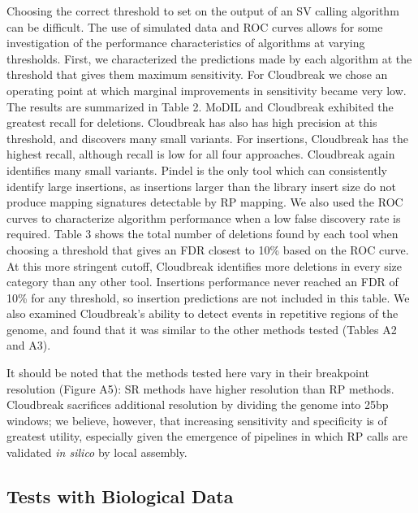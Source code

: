 \documentclass[10pt]{bmc_article}
\newenvironment{bmcformat}{\fussy\setboolean{publ}{true}}{\fussy}
\begin{document}
\begin{bmcformat}
Choosing the correct threshold to set on the output of an SV calling algorithm can be difficult. The use of simulated data and ROC curves allows for some investigation of the performance characteristics of algorithms at varying thresholds. First, we characterized the predictions made by each algorithm at the threshold that gives them maximum sensitivity. For Cloudbreak we chose an operating point at which marginal improvements in sensitivity became very low. The results are summarized in Table 2. MoDIL and Cloudbreak exhibited the greatest recall for deletions. Cloudbreak has also has high precision at this threshold, and discovers many small variants. For insertions, Cloudbreak has the highest recall, although recall is low for all four approaches. Cloudbreak again identifies many small variants. Pindel is the only tool which can consistently identify large insertions, as insertions larger than the library insert size do not produce mapping signatures detectable by RP mapping. We also used the ROC curves to characterize algorithm performance when a low false discovery rate is required. Table 3 shows the total number of deletions found by each tool when choosing a threshold that gives an FDR closest to 10\% based on the ROC curve. At this more stringent cutoff, Cloudbreak identifies more deletions in every size category than any other tool. Insertions performance never reached an FDR of 10\% for any threshold, so insertion predictions are not included in this table. We also examined Cloudbreak's ability to detect events in repetitive regions of the genome, and found that it was similar to the other methods tested (Tables A2 and A3).

It should be noted that the methods tested here vary in their breakpoint resolution (Figure A5): SR methods have higher resolution than RP methods. Cloudbreak sacrifices additional resolution by dividing the genome into 25bp windows; we believe, however, that increasing sensitivity and specificity is of greatest utility, especially given the emergence of pipelines in which RP calls are validated \emph{in silico} by local assembly.
    

\subsection*{Tests with Biological Data}


\end{bmcformat}
\end{document}
